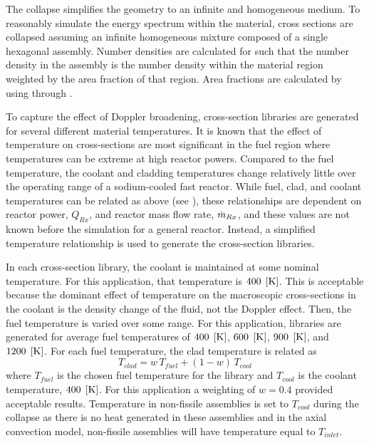     The collapse simplifies the geometry to an infinite and homogeneous medium.
    To reasonably simulate the energy spectrum within the material, cross 
    sections are collapsed assuming an infinite homogeneous mixture composed
    of a single hexagonal assembly. Number densities are calculated for such
    that the number density in the assembly is the number density within the
    material region weighted by the area fraction of that region. Area fractions
    are calculated by using  through .
    
    To capture the effect of Doppler broadening, cross-section libraries are
    generated for several different material temperatures.
    It is known that the effect of temperature on cross-sections are most
    significant in the fuel region where temperatures can be extreme at high
    reactor powers. Compared to the fuel temperature, the coolant and cladding
    temperatures change relatively little over the operating range of a
    sodium-cooled fast reactor.
    While fuel, clad, and coolant temperatures can be related as above (see
    ), these
    relationships are dependent on reactor power, $Q_{Rx}$, and reactor mass 
    flow rate, $\dot{m}_{Rx}$, and these values are not known before the
    simulation for a general reactor. Instead, a simplified temperature 
    relationship is used to generate the cross-section libraries.

    In each cross-section library, the coolant is maintained at some nominal
    temperature. For this application, that temperature is $400 \;\left[\text{{K}}\right]$. This
    is acceptable because the dominant effect of temperature on the macroscopic
    cross-sections in the coolant is the density change of the fluid, not the
    Doppler effect. Then, the fuel temperature is varied over some range. For
    this application, libraries are generated for average fuel temperatures of 
    $400 \;\left[\text{{K}}\right]$, $600 \;\left[\text{{K}}\right]$, $900 \;\left[\text{{K}}\right]$, and $1200 \;\left[\text{{K}}\right]$. For
    each fuel temperature, the clad temperature is related as 
    \begin{equation}
      T_{clad} = w \, T_{fuel} + (1-w) \, T_{cool}
    \end{equation}
    where $T_{fuel}$ is the chosen fuel temperature for the library and
    $T_{cool}$ is the coolant temperature, $400 \;\left[\text{{K}}\right]$. For this application
    a weighting of $w=0.4$ provided acceptable results. Temperature in
    non-fissile assemblies is set to $T_{cool}$ during the collapse as there is
    no heat generated in these assemblies and in the axial convection model,
    non-fissile assemblies will have temperature equal to $T_{inlet}$.

